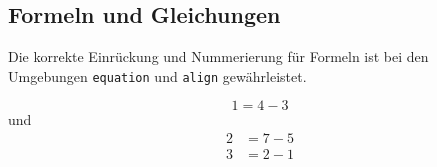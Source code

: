 \documentclass[utf8,biblatex]{lni}
\begin{document}
\subsection{Formeln und Gleichungen}

Die korrekte Einrückung und Nummerierung für Formeln ist bei den Umgebungen
\texttt{equation} und \texttt{align} gewährleistet.

\begin{equation}
  1=4-3
\end{equation}
und
\begin{align}
  2&=7-5\\
  3&=2-1
\end{align}

\printbibliography
\end{document}
